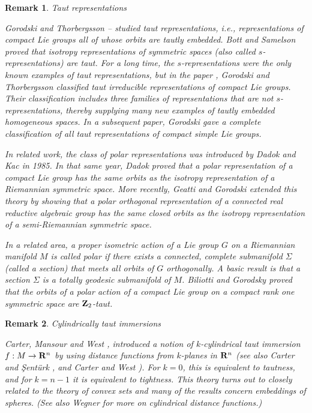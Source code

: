 \documentclass[12pt]{article}
\newtheorem{remark}{Remark}[section]
\begin{document}
{\begin{remark}{Taut representations}
\label{rem:taut-representations}

\noindent
{\rm Gorodski and Thorbergsson \cite{Gorodski-Thor-02}--\cite{Gorodski-Thor-03}  studied {\em taut representations}, 
i.e., representations of compact Lie groups all of whose orbits are tautly embedded. Bott and Samelson \cite{BS} proved that isotropy representations of symmetric spaces (also called $s$-representations) are taut.  For a long time, the $s$-representations were the only known examples of taut representations,
but in the paper \cite{Gorodski-Thor-03}, Gorodski and Thorbergsson classified taut irreducible representations of compact Lie groups.  Their classification includes three 
families of representations that are not $s$-representations, thereby supplying many new examples of tautly embedded homogeneous spaces.  In a subsequent paper, Gorodski \cite{Gorodski-08}
gave a complete classification of all taut representations of compact simple Lie groups. 

In related work, the class of polar representations was introduced by Dadok and Kac \cite{Dadok-Kac} in 1985. 
In that same year, Dadok \cite{Dadok} proved that a polar representation of a compact Lie group 
has the same orbits as the isotropy representation of a Riemannian symmetric space.   More recently, 
Geatti and Gorodski \cite{Geatti} extended this theory
by showing that a polar orthogonal representation of a connected real reductive
algebraic group has the same closed orbits as the isotropy representation of a semi-Riemannian symmetric space.

In a related area, a proper isometric action of a Lie group $G$ on a Riemannian manifold $M$ is called {\em polar}  if there exists a connected, complete submanifold $\Sigma$ (called a {\em section}) that meets all orbits of $G$
orthogonally.  A basic result is that a section $\Sigma$ is a totally geodesic submanifold of $M$.  Biliotti and Gorodsky \cite{Biliotti-Gorodski-07}
proved that the orbits 
of a polar action of a compact Lie group on a compact rank one
symmetric space are ${\bf Z}_2$-taut.}
\end{remark}



\begin{remark}{Cylindrically taut immersions}
\label{rem:cylindrically-taut}

\noindent
{\rm Carter, Mansour and West \cite{CMW}, \cite{CW5} introduced a notion of
$k$-{\em cylindrical taut} immersion  $f:M \rightarrow {\bf R}^n$
by using distance functions
from $k$-planes in  ${\bf R}^n$ (see also Carter and \c{S}ent\"{u}rk \cite{CS}, and Carter and West \cite{CW5}).
For $k = 0$, this is equivalent
to tautness, and for $k = n-1$ it is equivalent to tightness.
This theory turns out to closely related to the theory of convex
sets and many of the results concern embeddings of spheres.
(See also Wegner \cite{Weg} for more on cylindrical distance
functions.)}
\end{remark} 





}
\end{document}
